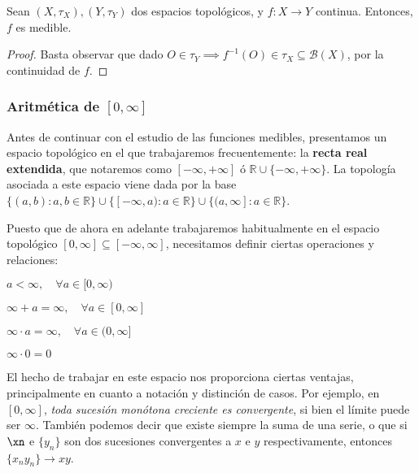 \begin{nprop} Sean $(X,\tau_X), (Y, \tau_Y)$ dos espacios topológicos, y $f:X\longrightarrow Y$ continua. Entonces, $f$ es medible.
\end{nprop}

\begin{proof} Basta observar que dado $O \in \tau_Y \implies f^{-1}(O) \in \tau_X \subseteq \mathcal B(X)$, por la continuidad de $f$.
\end{proof}


\subsubsection{Aritmética de $[0,\infty]$}

Antes de continuar con el estudio de las funciones medibles, presentamos un espacio topológico en el que trabajaremos frecuentemente: la \textbf{recta real extendida}, que notaremos como $[-\infty,+\infty]$ ó $\mathbb{R} \cup \{-\infty, +\infty\}$. La topología asociada a este espacio viene dada por la base $\{(a,b): a,b \in \mathbb{R}\} \cup \{[-\infty, a): a \in \mathbb{R}\} \cup \{(a,\infty]: a \in \mathbb{R}\}$.

Puesto que de ahora en adelante trabajaremos habitualmente en el espacio topológico $[0,\infty] \subseteq [-\infty,\infty]$, necesitamos definir ciertas operaciones y relaciones:
\begin{nlist}
\item $a < \infty, \quad \forall a \in [0,\infty)$
\item $\infty + a = \infty, \quad \forall a \in [0,\infty]$
\item $\infty \cdot a = \infty, \quad \forall a \in (0,\infty]$
\item $\infty \cdot 0 = 0$
\end{nlist}

El hecho de trabajar en este espacio nos proporciona ciertas ventajas, principalmente en cuanto a notación y distinción de casos. Por ejemplo, en $[0, \infty]$, \textit{toda sucesión monótona creciente es convergente}, si bien el límite puede ser $\infty$. También podemos decir que existe siempre la suma de una serie, o que si $\xn$ e $\{y_n\}$ son dos sucesiones convergentes a $x$ e $y$ respectivamente, entonces $\{x_ny_n\} \to xy$.


